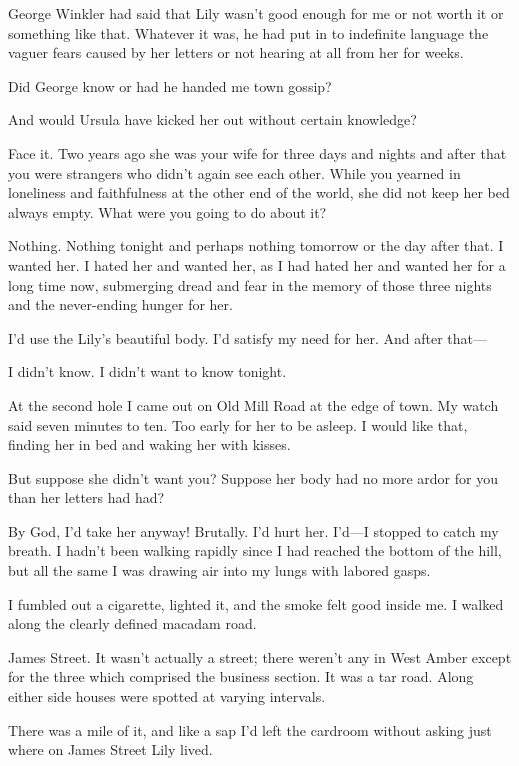 \documentclass{novel}
\begin{document}
George Winkler had said that Lily wasn’t good enough for me or not worth it or something like that. Whatever it was, he had put in to indefinite language the vaguer fears caused by her letters or not hearing at all from her for weeks. 

Did George know or had he handed me town gossip? 

And would Ursula have kicked her out without certain knowledge?

Face it. Two years ago she was your wife for three days and nights and after that you were strangers who didn’t again see each other. While you yearned in loneliness and faithfulness at the other end of the world, she did not keep her bed always empty. What were you going to do about it?

Nothing. Nothing tonight and perhaps nothing tomorrow or the day after that. I wanted her. I hated her and wanted her, as I had hated her and wanted her for a long time now, submerging dread and fear in the memory of those three nights and the never-ending hunger for her.

I’d use the Lily’s beautiful body. I’d satisfy my need for her. And after that—

I didn’t know. I didn’t want to know tonight.

At the second hole I came out on Old Mill Road at the edge of town. My watch said seven minutes to ten. Too early for her to be asleep. I would like that, finding her in bed and waking her with kisses.

But suppose she didn’t want you? Suppose her body had no more ardor for you than her letters had had?

By God, I’d take her anyway! Brutally. I’d hurt her. I’d—I stopped to catch my breath. I hadn’t been walking rapidly since I had reached the bottom of the hill, but all the same I was drawing air into my lungs with labored gasps. 

I fumbled out a cigarette, lighted it, and the smoke felt good inside me. I walked along the clearly defined macadam road.

\scenestars

James Street. It wasn’t actually a street; there weren’t any in West Amber except for the three which comprised the business section. It was a tar road. Along either side houses were spotted at varying intervals.

There was a mile of it, and like a sap I’d left the cardroom without asking just where on James Street Lily lived.
\end{document}
